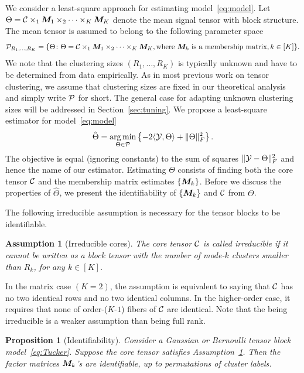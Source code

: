 \documentclass{article}
\newtheorem{prop}{Proposition}
\newtheorem{ass}{Assumption}
\begin{document}
We consider a least-square approach for estimating model~\eqref{eq:model}. Let $\Theta=\mathcal{C}\times_1\bm M_1\times_2\cdots\times_K\bm M_K$ denote the mean signal tensor with block structure. The mean tensor is assumed to belong to the following parameter space
\begin{equation}\label{eq:space}
\mathcal{P}_{R_1,\ldots,R_K}=\{ \Theta\colon \Theta=\mathcal{C}\times_1\bm M_1\times_2\cdots\times_K\bm M_K, \text{where }\bm M_k \text{ is a membership matrix}, k\in[K]\}.
\end{equation}
We note that the clustering sizes $(R_1,\ldots,R_K)$ is typically unknown and have to be determined from data empirically. As in most previous work on tensor clustering, we assume that clustering sizes are fixed in our theoretical analysis and simply write $\mathcal{P}$ for short. The general case for adapting unknown clustering sizes will be addressed in Section~\ref{sec:tuning}. We propose a least-square estimator for model~\eqref{eq:model}
\begin{equation}\label{eq:estimate}
\hat \Theta=\operatorname*{arg\,min}_{\Theta\in\mathcal{P}}\left\{ -2\langle \mathcal{Y},\Theta\rangle + \lVert\Theta\rVert_F^2\right\}.
\end{equation}
The objective is equal (ignoring constants) to the sum of squares $\lVert\mathcal{Y}-\Theta\rVert_F^2$ and hence the name of our estimator. Estimating $\Theta$ consists of finding both the core tensor $\mathcal{C}$ and the membership matrix estimates $\{\bm M_k\}$. Before we discuss the properties of $\hat \Theta$, we present the identifiability of $\{ \bm M_k\}$ and $\mathcal{C}$ from $\Theta$. 

The following irreducible assumption is necessary for the tensor blocks to be identifiable. 
\begin{ass}[Irreducible cores]\label{ass:core}
The core tensor $\mathcal{C}$ is called irreducible if it cannot be written as a block tensor with the number of mode-$k$ clusters smaller than $R_k$, for any $k\in[K]$. 
\end{ass}
In the matrix case $(K=2)$, the assumption is equivalent to saying that $\mathcal{C}$ has no two identical rows and no two identical columns. In the higher-order case, it requires that none of order-($K$-$1$) fibers of $\mathcal{C}$ are identical. Note that the being irreducible is a weaker assumption than being full rank. 

\begin{prop}[Identifiability]\label{prop:factors}
Consider a Gaussian or Bernoulli tensor block model~\eqref{eq:Tucker}. Suppose the core tensor satisfies Assumption~\ref{ass:core}. Then the factor matrices $\bm M_k$'s are identifiable, up to permutations of cluster labels. 
\end{prop}
\end{document}
